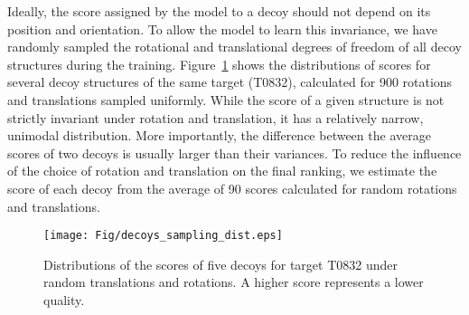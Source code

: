 Ideally, the score assigned by the model to a decoy should not depend
on its position and orientation.  To allow the model to learn this
invariance, we have randomly sampled the rotational and translational
degrees of freedom of all decoy structures during the training.
%
Figure~\ref{Fig:DecoysScoreDistribution} shows the distributions of
scores for several decoy structures of the same target (T0832),
calculated for 900 rotations and translations sampled uniformly.
While the score of a given structure is not strictly invariant under
rotation and translation, it has a relatively narrow, unimodal
distribution.
More importantly, the difference between the average scores of two
decoys is usually larger than their variances. To reduce the influence
of the choice of rotation and translation on the final ranking, we
estimate the score of each decoy from the average of 90 scores
calculated for random rotations and translations.

\begin{figure}[H]
    \centering
    \texttt{[image: Fig/decoys\_sampling\_dist.eps]}
%
    \caption{Distributions of the scores of five decoys for target
    T0832 under random translations and rotations. A higher score
    represents a lower quality.}
%
    \label{Fig:DecoysScoreDistribution}
\end{figure}


